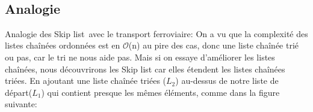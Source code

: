 \documentclass[hidelinks,a4paper,12pt]{article}
\begin{document}
~\\

\subsection{Analogie}
Analogie des Skip list avec le transport ferroviaire:
On a vu que la complexité des listes chaînées ordonnées est en $\mathcal{O}$(n) au pire des cas, donc une liste chaînée trié ou pas, car le tri ne nous aide pas. Mais si on essaye d’améliorer les listes chaînées, nous découvrirons les Skip list car elles étendent les listes chaînées triées. En ajoutant une liste chaînée triées ($L_2$) au-dessus de notre liste de départ($L_1$) qui contient presque les mêmes éléments, comme dans la figure suivante: \hypertarget{depart3}{\hyperlink{Rechercher36}{\textbf {}}}

\end{document}
